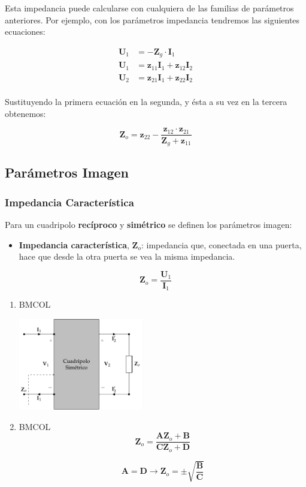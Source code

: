 Esta impedancia puede calcularse con cualquiera de las familias de parámetros anteriores. Por ejemplo, con los parámetros impedancia tendremos las siguientes ecuaciones:

\begin{align*}
  \mathbf{U}_1 &= - \mathbf{Z}_g \cdot \mathbf{I}_1\\
  \mathbf{U}_1 &= \mathbf{z}_{11} \mathbf{I}_1 + \mathbf{z}_{12} \mathbf{I}_2\\
  \mathbf{U}_2 &= \mathbf{z}_{21} \mathbf{I}_1 + \mathbf{z}_{22} \mathbf{I}_2\\
\end{align*}

Sustituyendo la primera ecuación en la segunda, y ésta a su vez en la tercera obtenemos:

\begin{equation*}
  \mathbf{Z}_o = \mathbf{z}_{22} - \dfrac{\mathbf{z}_{12} \cdot \mathbf{z}_{21}}{\mathbf{Z}_g + \mathbf{z}_{11}}
\end{equation*}

\subsection{Parámetros Imagen}
\label{sec:org5e458cf}

\subsubsection{Impedancia Característica}
\label{sec:orgcd34bb0}
Para un cuadripolo \textbf{recíproco} y \textbf{simétrico} se definen los parámetros imagen:

\begin{itemize}
\item \textbf{Impedancia característica}, \(\mathbf{Z}_o\): impedancia que, conectada en una puerta, hace que desde la otra puerta se vea la misma impedancia.
\end{itemize}
\[
  \mathbf{Z}_o = \frac{\mathbf{U}_1}{\mathbf{I}_1}
\]

\begin{enumerate}
\item \hfill{}\textsc{BMCOL}
\label{sec:org302b662}

\includegraphics[height=4cm]{../figs/cuadripolo_impedancia_caracteristica.pdf}


\item \hfill{}\textsc{BMCOL}
\label{sec:orgc75359e}
\[
\mathbf{Z}_o = \frac{\mathbf{A} \mathbf{Z}_o + \mathbf{B}}{\mathbf{C}\mathbf{Z}_o + \mathbf{D}}
\]

\[
\mathbf{A} = \mathbf{D} \rightarrow \boxed{\mathbf{Z}_o = \pm \sqrt{\frac{\mathbf{B}}{\mathbf{C}}}}
\]
\end{enumerate}

